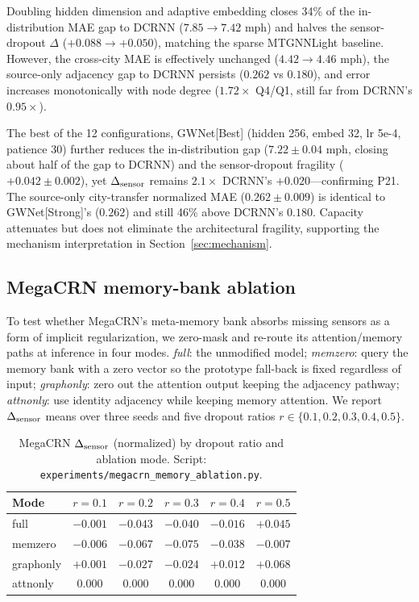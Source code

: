 Doubling hidden dimension and adaptive embedding closes 34\% of the in-distribution MAE
gap to DCRNN ($7.85 \to 7.42$ mph) and halves the sensor-dropout $\Delta$ ($+0.088 \to +0.050$),
matching the sparse MTGNNLight baseline. However, the cross-city MAE is effectively
unchanged ($4.42 \to 4.46$ mph), the source-only adjacency gap to DCRNN persists
($0.262$ vs $0.180$), and error increases monotonically with node degree ($1.72\times$ Q4/Q1, still far from DCRNN's $0.95\times$).

The best of the 12 configurations, GWNet[Best] (hidden 256, embed 32, lr 5e-4, patience 30)
further reduces the in-distribution gap ($7.22 \pm 0.04$ mph, closing about half of the gap
to DCRNN) and the sensor-dropout fragility ($+0.042 \pm 0.002$), yet
$\Delta_{\text{sensor}}$ remains $2.1\times$ DCRNN's $+0.020$---confirming P21.
The source-only city-transfer normalized MAE ($0.262 \pm 0.009$) is identical to
GWNet[Strong]'s ($0.262$) and still 46\% above DCRNN's $0.180$.
Capacity attenuates but does not eliminate the architectural fragility, supporting the
mechanism interpretation in Section~\ref{sec:mechanism}.

\subsection{MegaCRN memory-bank ablation}
\label{sec:appendix_memory_ablation}

To test whether MegaCRN's meta-memory bank absorbs missing sensors as a form of
implicit regularization, we zero-mask and re-route its attention/memory paths
at inference in four modes. \emph{full}: the unmodified model; \emph{memzero}:
query the memory bank with a zero vector so the prototype fall-back is fixed
regardless of input; \emph{graphonly}: zero out the attention output keeping
the adjacency pathway; \emph{attnonly}: use identity adjacency while keeping
memory attention. We report $\Delta_{\text{sensor}}$ means over three seeds and five
dropout ratios $r \in \{0.1, 0.2, 0.3, 0.4, 0.5\}$.

\begin{table}[h]
\centering
\caption{MegaCRN $\Delta_{\text{sensor}}$ (normalized) by dropout ratio and ablation
mode. Script: \texttt{experiments/megacrn\_memory\_ablation.py}.}
\label{tab:memory_ablation}
\vskip 0.05in
\small
\begin{tabular}{lccccc}
\toprule
\textbf{Mode}    & $r{=}0.1$ & $r{=}0.2$ & $r{=}0.3$ & $r{=}0.4$ & $r{=}0.5$ \\
\midrule
full        & ${-}0.001$ & ${-}0.043$ & ${-}0.040$ & ${-}0.016$ & ${+}0.045$ \\
memzero     & ${-}0.006$ & ${-}0.067$ & ${-}0.075$ & ${-}0.038$ & ${-}0.007$ \\
graphonly   & ${+}0.001$ & ${-}0.027$ & ${-}0.024$ & ${+}0.012$ & ${+}0.068$ \\
attnonly    & $0.000$    & $0.000$    & $0.000$    & $0.000$    & $0.000$    \\
\bottomrule
\end{tabular}
\end{table}

